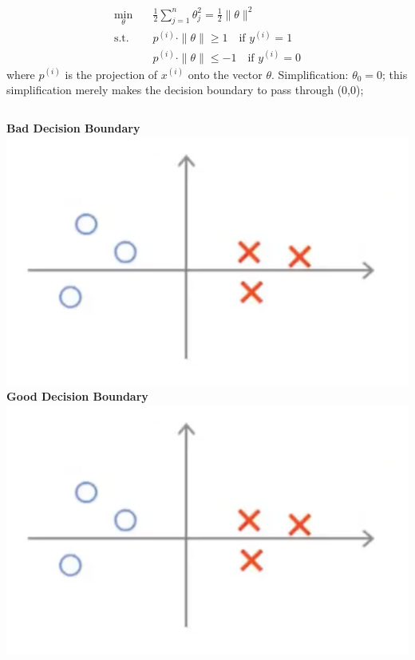 \documentclass[9pt,dvipsnames]{beamer}
\begin{document}
\begin{frame}
\begin{align*}
	\min_{\theta} \quad & \frac{1}{2} \sum_{j=1}^{n} \theta_{j}^{2} =\frac{1}{2}\|\theta\|^{2} \\
	\text{s.t.} \quad & p^{(i)} \cdot \|\theta\| \geq 1 \quad \text{if } y^{(i)}=1 \\
	& p^{(i)} \cdot \|\theta\| \leq -1 \quad \text{if } y^{(i)}=0
\end{align*}
where \(p^{(i)}\) is the projection of \(x^{(i)}\) onto the vector \(\theta\).
Simplification: \(\theta_{0}=0\); this simplification merely makes the decision boundary to pass through (0,0);
\vspace{0.3cm}
\begin{columns}
	\textbf{Bad Decision Boundary}
	\includegraphics[width = \textwidth]{imgs/svm_8.png}
	\textbf{Good Decision Boundary}
	\includegraphics[width = \textwidth]{imgs/svm_8.png}
\end{columns}
\end{frame}
\end{document}
